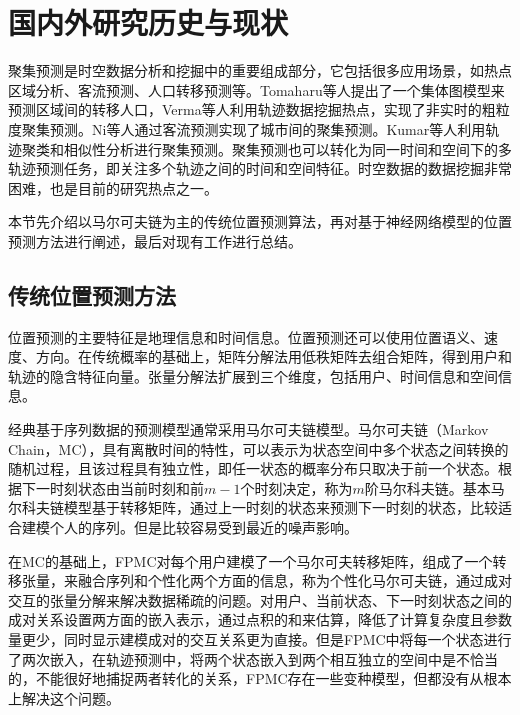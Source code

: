 \documentclass[master]{thesis-uestc}
\begin{document}
\section{国内外研究历史与现状}
聚集预测是时空数据分析和挖掘中的重要组成部分，它包括很多应用场景，如热点区域分析、客流预测、人口转移预测等。Tomaharu等人提出了一个集体图模型来预测区域间的转移人口，Verma等人利用轨迹数据挖掘热点，实现了非实时的粗粒度聚集预测。Ni等人通过客流预测实现了城市间的聚集预测。Kumar等人利用轨迹聚类和相似性分析进行聚集预测。聚集预测也可以转化为同一时间和空间下的多轨迹预测任务，即关注多个轨迹之间的时间和空间特征。时空数据的数据挖掘非常困难，也是目前的研究热点之一。

本节先介绍以马尔可夫链为主的传统位置预测算法，再对基于神经网络模型的位置预测方法进行阐述，最后对现有工作进行总结。

\subsection{传统位置预测方法}
位置预测的主要特征是地理信息和时间信息。位置预测还可以使用位置语义、速度、方向。在传统概率的基础上，矩阵分解法用低秩矩阵去组合矩阵，得到用户和轨迹的隐含特征向量。张量分解法扩展到三个维度，包括用户、时间信息和空间信息。

经典基于序列数据的预测模型通常采用马尔可夫链模型。马尔可夫链（Markov Chain，MC），具有离散时间的特性，可以表示为状态空间中多个状态之间转换的随机过程，且该过程具有独立性，即任一状态的概率分布只取决于前一个状态。根据下一时刻状态由当前时刻和前$m-1$个时刻决定，称为$m$阶马尔科夫链。基本马尔科夫链模型基于转移矩阵，通过上一时刻的状态来预测下一时刻的状态，比较适合建模个人的序列。但是比较容易受到最近的噪声影响。

在MC的基础上，FPMC对每个用户建模了一个马尔可夫转移矩阵，组成了一个转移张量，来融合序列和个性化两个方面的信息，称为个性化马尔可夫链，通过成对交互的张量分解来解决数据稀疏的问题。对用户、当前状态、下一时刻状态之间的成对关系设置两方面的嵌入表示，通过点积的和来估算，降低了计算复杂度且参数量更少，同时显示建模成对的交互关系更为直接。但是FPMC中将每一个状态进行了两次嵌入，在轨迹预测中，将两个状态嵌入到两个相互独立的空间中是不恰当的，不能很好地捕捉两者转化的关系，FPMC存在一些变种模型，但都没有从根本上解决这个问题。
\end{document}
